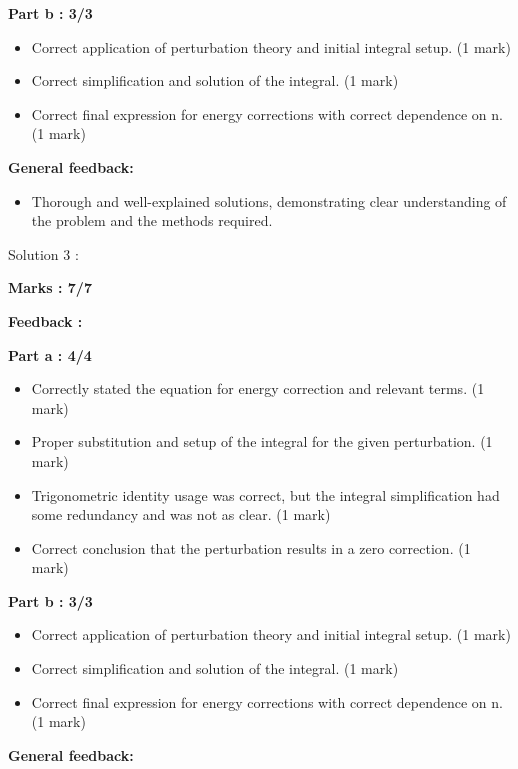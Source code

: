 \documentclass[a4paper,11pt]{article}
\begin{document}
\textbf{Part b : 3/3}

\begin{itemize}
    \item Correct application of perturbation theory and initial integral setup. (1 mark)
    \item Correct simplification and solution of the integral. (1 mark)
    \item Correct final expression for energy corrections with correct dependence on n. (1 mark)
\end{itemize}

\textbf{General feedback:}

\begin{itemize}
    \item Thorough and well-explained solutions, demonstrating clear understanding of the problem and the methods required.
\end{itemize}



Solution 3 :

\textbf{Marks : 7/7}

\textbf{Feedback :}

\textbf{Part a : 4/4}

\begin{itemize}
    \item Correctly stated the equation for energy correction and relevant terms. (1 mark)
    \item Proper substitution and setup of the integral for the given perturbation. (1 mark)
    \item Trigonometric identity usage was correct, but the integral simplification had some redundancy and was not as clear. (1 mark)
    \item Correct conclusion that the perturbation results in a zero correction. (1 mark)
\end{itemize}


\textbf{Part b : 3/3}

\begin{itemize}
    \item Correct application of perturbation theory and initial integral setup. (1 mark)
    \item Correct simplification and solution of the integral. (1 mark)
    \item Correct final expression for energy corrections with correct dependence on n. (1 mark)
\end{itemize}

\textbf{General feedback:}
\end{document}
